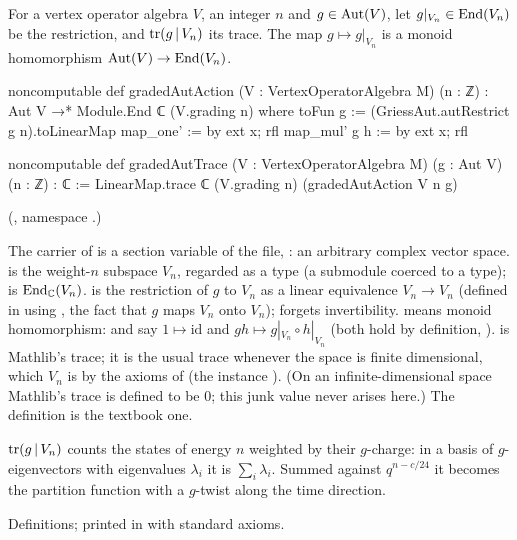 \begin{definition}\label{ch16:def:gradedtrace}
For a vertex operator algebra $V$, an integer $n$ and $g\in\operatorname{Aut}(V)$, let $g|_{V_n}\in\operatorname{End}(V_n)$ be the restriction,
and $\operatorname{tr}(g\,|\,V_n)$ its trace.  The map $g\mapsto g|_{V_n}$ is a monoid homomorphism $\operatorname{Aut}(V)\to\operatorname{End}(V_n)$.
\end{definition}
\begin{leancode}
noncomputable def gradedAutAction (V : VertexOperatorAlgebra M) (n : ℤ) :
    Aut V →* Module.End ℂ (V.grading n) where
  toFun g := (GriessAut.autRestrict g n).toLinearMap
  map_one' := by ext x; rfl
  map_mul' g h := by ext x; rfl

noncomputable def gradedAutTrace (V : VertexOperatorAlgebra M) (g : Aut V) (n : ℤ) : ℂ :=
  LinearMap.trace ℂ (V.grading n) (gradedAutAction V n g)
\end{leancode}
(, namespace .)
\begin{dictionary}
The carrier  of  is a section variable of the file, :
an arbitrary complex vector space.   is the weight-$n$ subspace $V_n$, regarded as a type (a
submodule coerced to a type);
 is $\operatorname{End}_{\mathbb{C}}(V_n)$.   is the restriction of $g$ to
$V_n$ as a linear equivalence $V_n\to V_n$ (defined in  using
, the fact that $g$ maps $V_n$ onto $V_n$);  forgets invertibility.
 means monoid homomorphism:  and  say $1\mapsto\mathrm{id}$ and
$gh\mapsto g|_{V_n}\circ h|_{V_n}$ (both hold by definition, ).   is
Mathlib's trace; it is the usual trace whenever the space is finite dimensional, which $V_n$ is by the axioms of
 (the instance ).  (On an infinite-dimensional space Mathlib's trace is
defined to be $0$; this junk value never arises here.)  The definition is the textbook one.
\end{dictionary}
\begin{physics}
$\operatorname{tr}(g\,|\,V_n)$ counts the states of energy $n$ weighted by their $g$-charge: in a basis of $g$-eigenvectors with
eigenvalues $\lambda_i$ it is $\sum_i\lambda_i$.  Summed against $q^{n-c/24}$ it becomes the partition function with
a $g$-twist along the time direction.
\end{physics}
\begin{status}
Definitions; printed in  with standard axioms.
\end{status}

